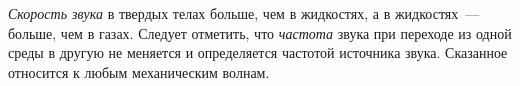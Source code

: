 \documentclass[main.tex]{subfiles}
\begin{document}
\emph{Скорость звука} в твердых телах больше, чем в жидкостях, а в жидкостях~--- больше, чем в газах. Следует отметить, что \emph{частота} звука при переходе из одной среды в другую не меняется и определяется частотой источника звука. Сказанное относится к любым механическим волнам. 



























 
\end{document}

